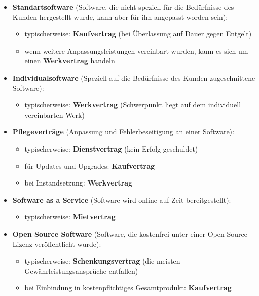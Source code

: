 \documentclass[12pt,A4]{extarticle}
\begin{document}
\begin{itemize}
  \item{\textbf{Standartsoftware} (Software, die nicht speziell für die Bedürfnisse des Kunden hergestellt wurde, kann aber für ihn angepasst worden sein):
    \begin{itemize}
      \item{typischerweise: \textbf{Kaufvertrag} (bei Überlassung auf Dauer gegen Entgelt)}
      \item{wenn weitere Anpassungsleistungen vereinbart wurden, kann es sich um einen \textbf{Werkvertrag} handeln}
    \end{itemize}
  }
  \item{\textbf{Individualsoftware} (Speziell auf die Bedürfnisse des Kunden zugeschnittene Software):
    \begin{itemize}
      \item{typischerweise: \textbf{Werkvertrag} (Schwerpunkt liegt auf dem individuell vereinbarten Werk)}
    \end{itemize}
  }
  \item{\textbf{Pflegeverträge} (Anpassung und Fehlerbeseitigung an einer Software):
    \begin{itemize}
      \item{typischerweise: \textbf{Dienstvertrag} (kein Erfolg geschuldet)}
      \item{für Updates und Upgrades: \textbf{Kaufvertrag}}
      \item{bei Instandsetzung: \textbf{Werkvertrag}}
    \end{itemize}
  }
  \item{\textbf{Software as a Service} (Software wird online auf Zeit bereitgestellt):
    \begin{itemize}
      \item{typischerweise: \textbf{Mietvertrag}}
    \end{itemize}
  }
  \item{\textbf{Open Source Software} (Software, die kostenfrei unter einer Open Source Lizenz veröffentlicht wurde):
    \begin{itemize}
      \item{typischerweise: \textbf{Schenkungsvertrag} (die meisten Gewährleistungsansprüche entfallen)}
      \item{bei Einbindung in kostenpflichtiges Gesamtprodukt: \textbf{Kaufvertrag}}
    \end{itemize}
  }
\end{itemize}
\end{document}
